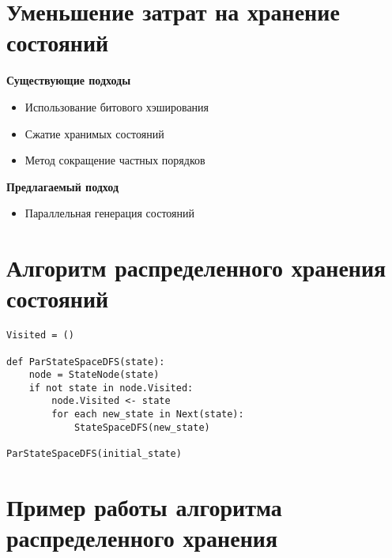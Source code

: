 \documentclass[12pt]{article}
\begin{document}
\section{Уменьшение затрат на хранение состояний}
\label{sec:ram-lightening}

\begin{minipage}[t]{0.5\linewidth}
  \textbf{Существующие подходы}

  \begin{flushleft}
    \begin{itemize}
    \item Использование битового \mbox{хэширования}
    \item Сжатие хранимых состояний
    \item Метод сокращение частных порядков
    \end{itemize}
  \end{flushleft}
\end{minipage}
\begin{minipage}[t]{0.5\linewidth}
  \begin{flushleft}
   \textbf{ Предлагаемый подход}

    \begin{itemize}
    \item Параллельная \mbox{генерация} состояний
    \end{itemize}
  \end{flushleft}
\end{minipage}

\section{Алгоритм распределенного хранения состояний}
\label{sec:distr-storage}

\begin{lstlisting}[style=pseudocode]
Visited = ()

def ParStateSpaceDFS(state):
    node = StateNode(state)
    if not state in node.Visited:
        node.Visited <- state
        for each new_state in Next(state):
            StateSpaceDFS(new_state)

ParStateSpaceDFS(initial_state)
\end{lstlisting}

\section{Пример работы алгоритма распределенного хранения}
\label{sec:distr-storage2}
\end{document}
